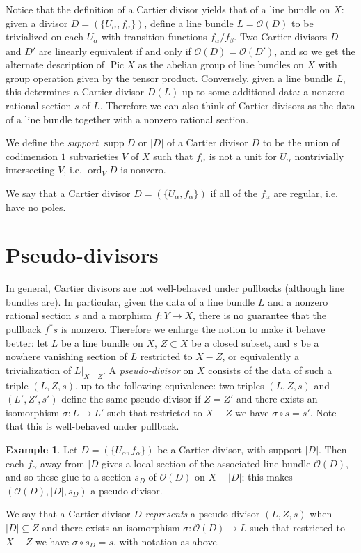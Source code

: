 \documentclass[12pt]{article}
\theoremstyle{definition}
\newtheorem{ex}[defn]{Example}
\theoremstyle{theorem}
\renewcommand{\O}{\mathcal O}
\newcommand{\1}{\mathbbm 1}
\DeclareMathOperator{\Pic}{Pic}
\DeclareMathOperator{\ord}{ord}
\DeclareMathOperator{\supp}{supp}
\begin{document}
Notice that the definition of a Cartier divisor yields that of a line bundle on $X$: given a divisor $D = (\{U_\alpha, f_\alpha\})$, define a line bundle $L = \O(D)$ to be trivialized on each $U_\alpha$ with transition functions $f_\alpha/f_\beta$. Two Cartier divisors $D$ and $D'$ are linearly equivalent if and only if $\O(D) = \O(D')$, and so we get the alternate description of $\Pic X$ as the abelian group of line bundles on $X$ with group operation given by the tensor product. Conversely, given a line bundle $L$, this determines a Cartier divisor $D(L)$ up to some additional data: a nonzero rational section $s$ of $L$. Therefore we can also think of Cartier divisors as the data of a line bundle together with a nonzero rational section.

We define the {\em support} $\supp D$ or $|D|$ of a Cartier divisor $D$ to be the union of codimension $1$ subvarieties $V$ of $X$ such that $f_\alpha$ is not a unit for $U_\alpha$ nontrivially intersecting $V$, i.e. $\ord_V D$ is nonzero.

We say that a Cartier divisor $D = (\{U_\alpha, f_\alpha\})$ if all of the $f_\alpha$ are regular, i.e. have no poles.

\section{Pseudo-divisors}
In general, Cartier divisors are not well-behaved under pullbacks (although line bundles are). In particular, given the data of a line bundle $L$ and a nonzero rational section $s$ and a morphism $f: Y \to X$, there is no guarantee that the pullback $f^* s$ is nonzero. Therefore we enlarge the notion to make it behave better: let $L$ be a line bundle on $X$, $Z \subset X$ be a closed subset, and $s$ be a nowhere vanishing section of $L$ restricted to $X-Z$, or equivalently a trivialization of $L|_{X-Z}$. A {\em pseudo-divisor} on $X$ consists of the data of such a triple $(L,Z,s)$, up to the following equivalence: two triples $(L,Z,s)$ and $(L',Z',s')$ define the same pseudo-divisor if $Z = Z'$ and there exists an isomorphism $\sigma: L \to L'$ such that restricted to $X-Z$ we have $\sigma \circ s = s'$. Note that this is well-behaved under pullback.

\begin{ex}
Let $D = (\{U_\alpha, f_\alpha\})$ be a Cartier divisor, with support $|D|$. Then each $f_\alpha$ away from $|D$ gives a local section of the associated line bundle $\O(D)$, and so these glue to a section $s_D$ of $\O(D)$ on $X-|D|$; this makes $(\O(D), |D|, s_D)$ a pseudo-divisor.

We say that a Cartier divisor $D$ {\em represents} a pseudo-divisor $(L,Z,s)$ when $|D| \subseteq Z$ and there exists an isomorphism $\sigma: \O(D) \to L$ such that restricted to $X-Z$ we have $\sigma \circ s_D = s$, with notation as above.
\end{ex}
\end{document}
